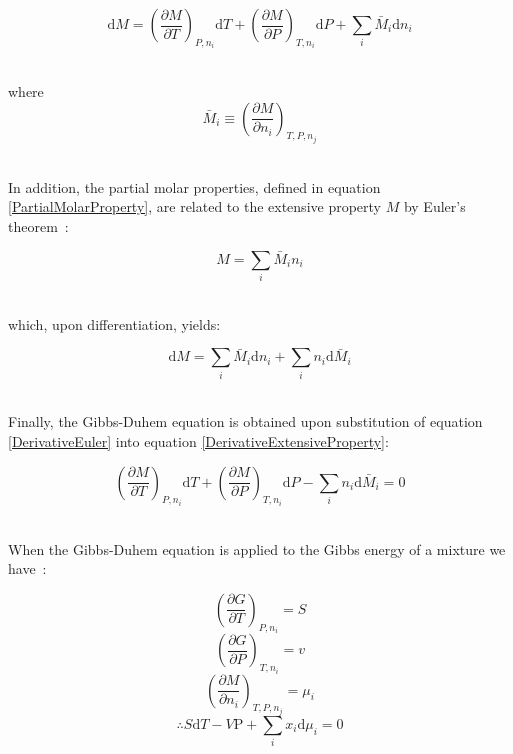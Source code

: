 \begin{equation}
\mathrm{d}M = \left( \frac{\partial M}{\partial T}\right)_{P, n_{i}} \mathrm{d}T + \left( \frac{\partial M}{\partial P}\right)_{T, n_{i}} \mathrm{d}P + \sum_{i} \bar{M}_{i} \mathrm{d}n_{i} \label{DerivativeExtensiveProperty}
\end{equation}\

where\
\begin{equation}
\bar{M}_{i} \equiv \left(\frac{\partial M}{\partial n_{i}}\right)_{T, P, n_{j}} \label{PartialMolarProperty}
\end{equation}\


In addition, the partial molar properties, defined in equation \ref{PartialMolarProperty}, are related to the extensive property $M$ by Euler's theorem~\cite{MolecularThermodynamicsOfFluidPhaseEquilibria}:\

\begin{equation}
M = \sum_{i} \bar{M}_{i} n_{i} \label{Euler}
\end{equation}\

which, upon differentiation, yields:\

\begin{equation}
\mathrm{d}M = \sum_{i} \bar{M}_{i}\mathrm{d}n_{i} + \sum_{i} n_{i}\mathrm{d}\bar{M}_{i} \label{DerivativeEuler}
\end{equation}\

Finally, the Gibbs-Duhem equation is obtained upon substitution of equation \ref{DerivativeEuler} into equation \ref{DerivativeExtensiveProperty}:\

\begin{equation}
 \left( \frac{\partial M}{\partial T}\right)_{P, n_{i}} \mathrm{d}T + \left( \frac{\partial M}{\partial P}\right)_{T, n_{i}} \mathrm{d}P - \sum_{i} n_{i} \mathrm{d}\bar{M}_{i} = 0 \label{GibbsDuhem}
\end{equation}\

When the Gibbs-Duhem equation is applied to the Gibbs energy of a mixture we have~\cite{MolecularThermodynamicsOfFluidPhaseEquilibria}:\

\begin{equation}
 \left( \frac{\partial G}{\partial T}\right)_{P, n_{i}} = S \label{GibbsTempDerivative}
\end{equation}
\begin{equation}
 \left( \frac{\partial G}{\partial P}\right)_{T, n_{i}} = v\label{GibbsPressureDerivative}
 \end{equation}
 \begin{equation}
 \left( \frac{\partial M}{\partial n_{i}}\right)_{T, P, n_{j}} = \mu_{i}
\end{equation}
\begin{equation}
\therefore S\mathrm{d}T - V \mathrm{P} + \sum_{i} x_{i} \mathrm{d}\mu_{i} = 0 \label{GibbsEnergyGibbsDuhem}
\end{equation}\

